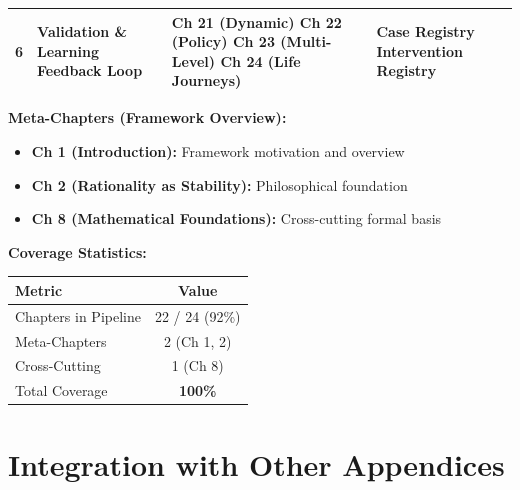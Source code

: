 \begin{tcolorbox}[colback=blue!3!white, colframe=blue!60!black,
    title=\textbf{All 24 Chapters Mapped to 6-Stage Pipeline}]
\begin{center}
\begin{longtable}{|c|p{4.5cm}|p{4cm}|p{3cm}|}
\hline
\textbf{6} & \textbf{Validation \& Learning} \newline Feedback Loop & Ch 21 (Dynamic) \newline Ch 22 (Policy) \newline Ch 23 (Multi-Level) \newline Ch 24 (Life Journeys) & Case Registry \newline Intervention Registry \\
\hline
\end{longtable}
\end{center}

\vspace{0.5em}
\textbf{Meta-Chapters (Framework Overview):}
\begin{itemize}[nosep]
    \item \textbf{Ch 1 (Introduction):} Framework motivation and overview
    \item \textbf{Ch 2 (Rationality as Stability):} Philosophical foundation
    \item \textbf{Ch 8 (Mathematical Foundations):} Cross-cutting formal basis
\end{itemize}

\vspace{0.5em}
\textbf{Coverage Statistics:}
\begin{center}
\begin{tabular}{|l|c|}
\hline
\textbf{Metric} & \textbf{Value} \\
\hline
\hline
Chapters in Pipeline & 22 / 24 (92\%) \\
Meta-Chapters & 2 (Ch 1, 2) \\
Cross-Cutting & 1 (Ch 8) \\
Total Coverage & \textbf{100\%} \\
\hline
\end{tabular}
\end{center}

\end{tcolorbox}

\section{Integration with Other Appendices}
\label{sec:dp-integration}

